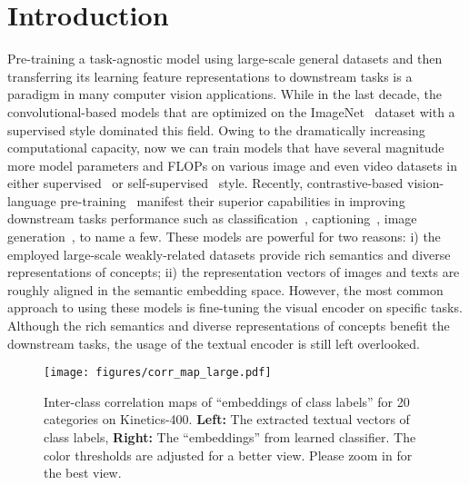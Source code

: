 \documentclass[letterpaper]{article} \usepackage{aaai23}  \usepackage{times}  \usepackage{helvet}  \usepackage{courier}  \usepackage[hyphens]{url}  \usepackage{graphicx} \urlstyle{rm} \def\UrlFont{\rm}  \usepackage{natbib}  \usepackage{caption} \frenchspacing  \setlength{\pdfpagewidth}{8.5in}  \setlength{\pdfpageheight}{11in}  \usepackage{algorithm}
\begin{document}
\section{Introduction}
\label{sec:intro}
Pre-training a task-agnostic model using large-scale general datasets and then transferring its learning feature representations to downstream tasks is a paradigm in many computer vision applications. 
While in the last decade, the convolutional-based models that are optimized on the ImageNet~\cite{deng2009imagenet} dataset with a supervised style dominated this field. Owing to the dramatically increasing computational capacity, now we can train models that have several magnitude more model parameters and FLOPs on various image and even video datasets in either supervised~\cite{JFT300M} or self-supervised~\cite{he2020momentum,huang2021ascnet,fang2022mamico} style.
Recently, contrastive-based vision-language pre-training~\cite{CLIP} manifest their superior capabilities in improving downstream tasks performance such as classification~\cite{CLIP}, captioning~\cite{mokady2021clipcap}, image generation~\cite{DALLE}, to name a few. These models are powerful for two reasons: i) the employed large-scale weakly-related datasets provide rich semantics and diverse representations of concepts; ii) the representation vectors of images and texts are roughly aligned in the semantic embedding space.
However, the most common approach to using these models is fine-tuning the visual encoder on specific tasks. Although the rich semantics and diverse representations of concepts benefit the downstream tasks, the usage of the textual encoder is still left overlooked.



\begin{figure}
\begin{center}
\texttt{[image: figures/corr\_map\_large.pdf]}
\end{center}
\caption{Inter-class correlation maps of ``embeddings of class labels'' for 20 categories on Kinetics-400.
\textbf{Left:} The extracted textual vectors of class labels, \textbf{Right:} The ``embeddings'' from learned classifier. The color thresholds are adjusted for a better view. Please zoom in for the best view.}
\label{fig:intro_heatmap}
\end{figure}
\end{document}
